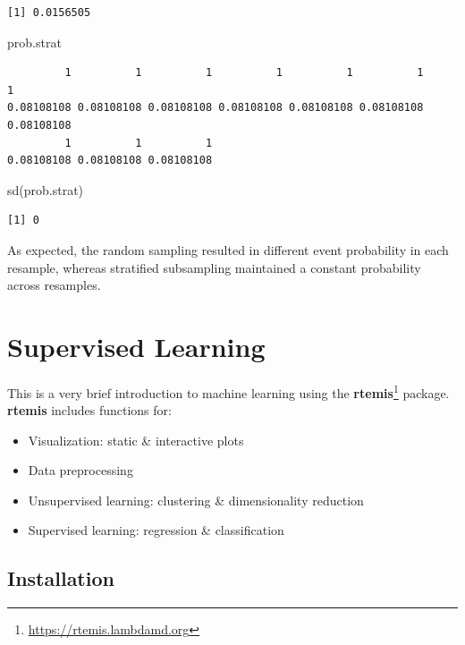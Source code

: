 \documentclass[
]{book}
\newenvironment{Shaded}{\begin{snugshade}}{\end{snugshade}}
\newcommand{\FunctionTok}[1]{\textcolor[rgb]{0.00,0.00,0.00}{#1}}
\newcommand{\NormalTok}[1]{#1}
\DeclareRobustCommand{\href}[2]{#2\footnote{\url{#1}}}
\providecommand{\tightlist}{%
  \setlength{\itemsep}{0pt}\setlength{\parskip}{0pt}}
\begin{document}
\begin{verbatim}
[1] 0.0156505
\end{verbatim}

\begin{Shaded}
\begin{Highlighting}[]
\NormalTok{prob.strat}
\end{Highlighting}
\end{Shaded}

\begin{verbatim}
         1          1          1          1          1          1          1 
0.08108108 0.08108108 0.08108108 0.08108108 0.08108108 0.08108108 0.08108108 
         1          1          1 
0.08108108 0.08108108 0.08108108 
\end{verbatim}

\begin{Shaded}
\begin{Highlighting}[]
\FunctionTok{sd}\NormalTok{(prob.strat)}
\end{Highlighting}
\end{Shaded}

\begin{verbatim}
[1] 0
\end{verbatim}

As expected, the random sampling resulted in different event probability in each resample, whereas stratified subsampling maintained a constant probability across resamples.

\hypertarget{supervised}{%
\chapter{Supervised Learning}\label{supervised}}

This is a very brief introduction to machine learning using the \href{https://rtemis.lambdamd.org}{\textbf{rtemis}} package. \textbf{rtemis} includes functions for:

\begin{itemize}
\tightlist
\item
  Visualization: static \& interactive plots
\item
  Data preprocessing
\item
  Unsupervised learning: clustering \& dimensionality reduction
\item
  Supervised learning: regression \& classification
\end{itemize}

\hypertarget{installation-1}{%
\section{Installation}\label{installation-1}}
\end{document}
